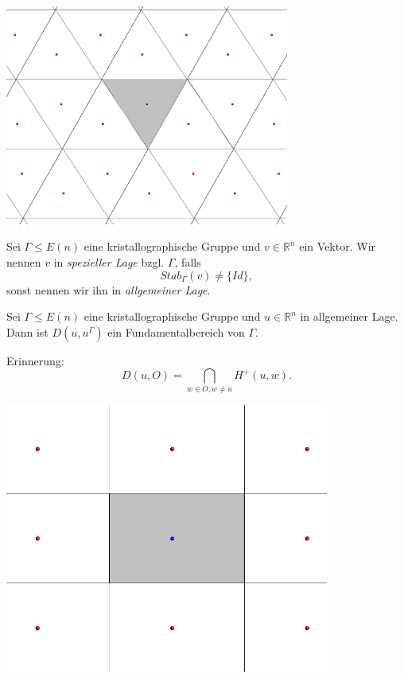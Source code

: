 \documentclass{beamer}
\theoremstyle{plain}
\newcommand\R{\mathbb R}
\begin{document}
\begin{frame}
    \centering
    \includegraphics[width=0.7\textwidth]{images/p2-hex-dirichlet.png}
\end{frame}

\begin{frame}
    \begin{definition}
        Sei $\Gamma \leq E(n)$ eine kristallographische Gruppe und $v \in \R^n$ ein Vektor.
        Wir nennen $v$ in \emph{spezieller Lage} bzgl. $\Gamma$, falls 
        $$
            Stab_\Gamma(v) \neq \{Id\},
        $$
        sonst nennen wir ihn in \emph{allgemeiner Lage}.
    \end{definition}
    \pause
    \begin{theorem}
        Sei $\Gamma \leq E(n)$ eine kristallographische Gruppe und $u \in \R^n$ in allgemeiner Lage. Dann ist $D(u, u^\Gamma)$ ein Fundamentalbereich von $\Gamma$.
    \end{theorem}
    \pause
    Erinnerung:
    $$
		D(u, O) = \bigcap_{w \in O, w \neq u} H^+(u, w).
	$$
\end{frame}

\begin{frame}
    \centering
    \includegraphics[width=0.8\textwidth]{images/dirichlet-example.png}
\end{frame}
\end{document}
